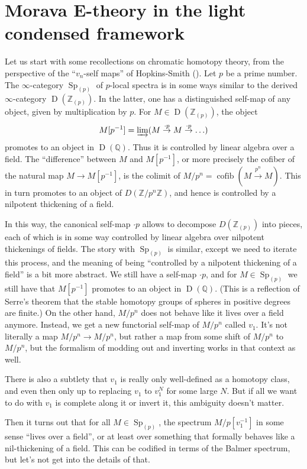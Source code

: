 \documentclass[12pt]{article}
\newcommand{\on}{\operatorname}
\begin{document}
\section{Morava E-theory in the light condensed framework}\label{esec}

Let us start with some recollections on chromatic homotopy theory, from the perspective of the ``$v_n$-self maps'' of Hopkins-Smith (\cite{HopkinsNilpotence}).  Let $p$ be a prime number.  The $\infty$-category $\on{Sp}_{(p)}$ of $p$-local spectra is in some ways similar to the derived $\infty$-category $\on{D}(\mathbb{Z}_{(p)})$.  In the latter, one has a distinguished self-map of any object, given by multiplication by $p$.  For $M\in\on{D}(\mathbb{Z}_{(p)})$, the object
$$M[p^{-1}] = \varinjlim(M\overset{\cdot p}{\to}M\overset{\cdot p}{\to}\ldots)$$
promotes to an object in $\on{D}(\mathbb{Q})$.  Thus it is controlled by linear algebra over a field.  The ``difference'' between $M$ and $M[p^{-1}]$, or more precisely the cofiber of the natural map $M \to M[p^{-1}]$, is the colimit of $M/p^n = \on{cofib}(M\overset{p^n}{\to}M)$.  This in turn promotes to an object of $D(\mathbb{Z}/p^n\mathbb{Z})$, and hence is controlled by a nilpotent thickening of a field.

In this way, the canonical self-map $\cdot p$ allows to decompose $D(\mathbb{Z}_{(p)})$ into pieces, each of which is in some way controlled by linear algebra over nilpotent thickenings of fields.  The story with $\on{Sp}_{(p)}$ is similar, except we need to iterate this process, and the meaning of being ``controlled by a nilpotent thickening of a field'' is a bit more abstract.  We still have a self-map $\cdot p$, and for $M\in\on{Sp}_{(p)}$ we still have that $M[p^{-1}]$ promotes to an object in $\on{D}(\mathbb{Q})$.  (This is a reflection of Serre's theorem that the stable homotopy groups of spheres in positive degrees are finite.)  On the other hand, $M/p^n$ does not behave like it lives over a field anymore.  Instead, we get a new functorial self-map of $M/p^n$ called $v_1$.  It's not literally a map $M/p^n\to M/p^n$, but rather a map from some shift of $M/p^n$ to $M/p^n$, but the formalism of modding out and inverting works in that context as well.

There is also a subtlety that $v_1$ is really only well-defined as a homotopy class, and even then only up to replacing $v_1$ to $v_1^N$ for some large $N$.  But if all we want to do with $v_1$ is complete along it or invert it, this ambiguity doesn't matter.

Then it turns out that for all $M\in\on{Sp}_{(p)}$, the spectrum $M/p[v_1^{-1}]$ in some sense ``lives over a field'', or at least over something that formally behaves like a nil-thickening of a field.  This can be codified in terms of the Balmer spectrum, but let's not get into the details of that.
\end{document}

